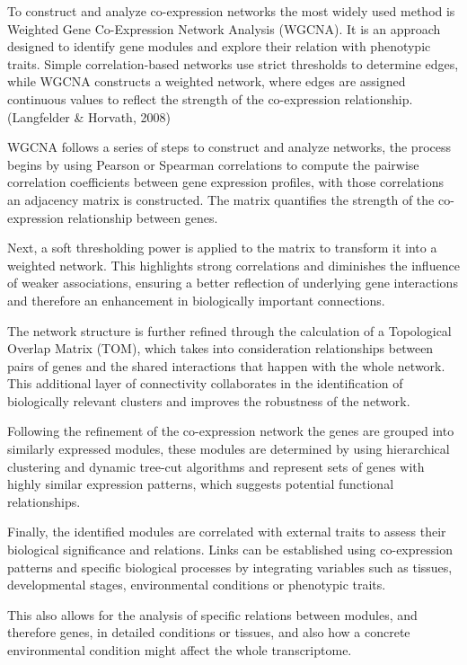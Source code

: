 \documentclass[
]{article}
\begin{document}
To construct and analyze co-expression networks the most widely used
method is Weighted Gene Co-Expression Network Analysis (WGCNA). It is an
approach designed to identify gene modules and explore their relation
with phenotypic traits. Simple correlation-based networks use strict
thresholds to determine edges, while WGCNA constructs a weighted
network, where edges are assigned continuous values to reflect the
strength of the co-expression relationship. {(Langfelder \&
Horvath, 2008)}

WGCNA follows a series of steps to construct and analyze networks, the
process begins by using Pearson or Spearman correlations to compute the
pairwise correlation coefficients between gene expression profiles, with
those correlations an adjacency matrix is constructed. The matrix
quantifies the strength of the co-expression relationship between genes.

Next, a soft thresholding power is applied to the matrix to transform it
into a weighted network. This highlights strong correlations and
diminishes the influence of weaker associations, ensuring a better
reflection of underlying gene interactions and therefore an enhancement
in biologically important connections.

The network structure is further refined through the calculation of a
Topological Overlap Matrix (TOM), which takes into consideration
relationships between pairs of genes and the shared interactions that
happen with the whole network. This additional layer of connectivity
collaborates in the identification of biologically relevant clusters and
improves the robustness of the network.

Following the refinement of the co-expression network the genes are
grouped into similarly expressed modules, these modules are determined
by using hierarchical clustering and dynamic tree-cut algorithms and
represent sets of genes with highly similar expression patterns, which
suggests potential functional relationships.

Finally, the identified modules are correlated with external traits to
assess their biological significance and relations. Links can be
established using co-expression patterns and specific biological
processes by integrating variables such as tissues, developmental
stages, environmental conditions or phenotypic traits.

This also allows for the analysis of specific relations between modules,
and therefore genes, in detailed conditions or tissues, and also how a
concrete environmental condition might affect the whole transcriptome.
\end{document}
